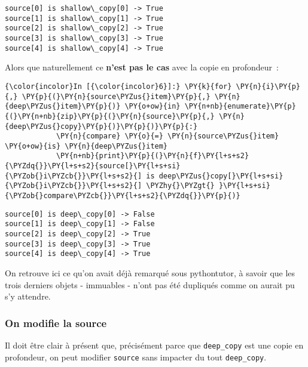     \begin{Verbatim}[commandchars=\\\{\}]
source[0] is shallow\_copy[0] -> True
source[1] is shallow\_copy[1] -> True
source[2] is shallow\_copy[2] -> True
source[3] is shallow\_copy[3] -> True
source[4] is shallow\_copy[4] -> True

    \end{Verbatim}

    Alors que naturellement ce \textbf{n'est pas le cas} avec la copie en
profondeur~:

    \begin{Verbatim}[commandchars=\\\{\}]
{\color{incolor}In [{\color{incolor}6}]:} \PY{k}{for} \PY{n}{i}\PY{p}{,} \PY{p}{(}\PY{n}{source\PYZus{}item}\PY{p}{,} \PY{n}{deep\PYZus{}item}\PY{p}{)} \PY{o+ow}{in} \PY{n+nb}{enumerate}\PY{p}{(}\PY{n+nb}{zip}\PY{p}{(}\PY{n}{source}\PY{p}{,} \PY{n}{deep\PYZus{}copy}\PY{p}{)}\PY{p}{)}\PY{p}{:}
            \PY{n}{compare} \PY{o}{=} \PY{n}{source\PYZus{}item} \PY{o+ow}{is} \PY{n}{deep\PYZus{}item}
            \PY{n+nb}{print}\PY{p}{(}\PY{n}{f}\PY{l+s+s2}{\PYZdq{}}\PY{l+s+s2}{source[}\PY{l+s+si}{\PYZob{}i\PYZcb{}}\PY{l+s+s2}{] is deep\PYZus{}copy[}\PY{l+s+si}{\PYZob{}i\PYZcb{}}\PY{l+s+s2}{] \PYZhy{}\PYZgt{} }\PY{l+s+si}{\PYZob{}compare\PYZcb{}}\PY{l+s+s2}{\PYZdq{}}\PY{p}{)}
\end{Verbatim}


    \begin{Verbatim}[commandchars=\\\{\}]
source[0] is deep\_copy[0] -> False
source[1] is deep\_copy[1] -> False
source[2] is deep\_copy[2] -> True
source[3] is deep\_copy[3] -> True
source[4] is deep\_copy[4] -> True

    \end{Verbatim}

    On retrouve ici ce qu'on avait déjà remarqué sous pythontutor, à savoir
que les trois derniers objets - immuables - n'ont pas été dupliqués
comme on aurait pu s'y attendre.

    \hypertarget{on-modifie-la-source}{%
\subsubsection{On modifie la source}\label{on-modifie-la-source}}

    Il doit être clair à présent que, précisément parce que
\texttt{deep\_copy} est une copie en profondeur, on peut modifier
\texttt{source} sans impacter du tout \texttt{deep\_copy}.\\

